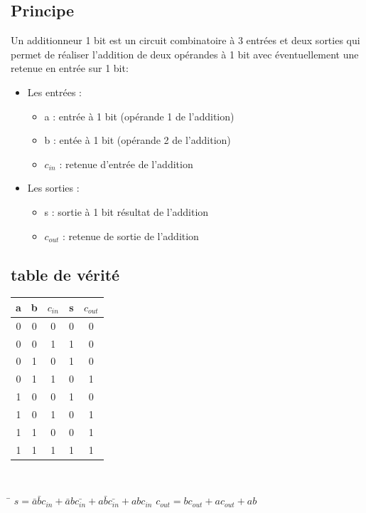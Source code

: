 \documentclass[10pt,a4paper]{article}
\begin{document}
\subsection{Principe}
Un additionneur 1 bit est un circuit combinatoire à 3 entrées et deux sorties qui permet de réaliser l'addition de deux opérandes à 1 bit avec éventuellement une retenue en entrée sur 1 bit:
\begin{itemize}
\item 	Les entrées :
		\begin{itemize}
		\item a : entrée à 1 bit (opérande 1 de l'addition)
		\item b : entée à 1	bit (opérande 2 de l'addition)
		\item $c_{in}$ : retenue d'entrée de l'addition
		\end{itemize}
\item 	Les sorties :
		\begin{itemize}
		\item s : sortie à 1 bit résultat de l'addition
		\item $c_{out}$ : retenue de sortie de l'addition
		\end{itemize}
\end{itemize}

\subsection{table de vérité}
\begin{tabular}{ccc|cc}
a & b & $c_{in}$ & s & $c_{out}$ \\ 
\hline 
0 & 0 & 0 & 0 & 0 \\
0 & 0 & 1 & 1 & 0 \\
0 & 1 & 0 & 1 & 0 \\
0 & 1 & 1 & 0 & 1 \\
1 & 0 & 0 & 1 & 0 \\
1 & 0 & 1 & 0 & 1 \\
1 & 1 & 0 & 0 & 1 \\
1 & 1 & 1 & 1 & 1 \\
\end{tabular} \\

\begin{tabbing}
\hspace{7cm}\=\kill
 $s = \bar{a}\bar{b}c_{in}+\bar{a}b\bar{c_{in}}+a\bar{b}\bar{c_{in}}+abc_{in}$ \> $c_{out} = bc_{out}+ac_{out}+ab $ 
\end{tabbing} 
\end{document}
